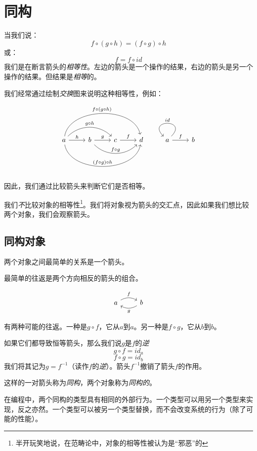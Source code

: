 \documentclass[DaoFP]{subfiles}
\begin{document}
\setcounter{chapter}{2}


\chapter{同构}

当我们说：
\[f \circ (g \circ h) = (f \circ g) \circ h \]
或：
\[ f = f \circ id \]
我们是在断言箭头的\emph{相等性}。左边的箭头是一个操作的结果，右边的箭头是另一个操作的结果。但结果是\emph{相等}的。

我们经常通过绘制\emph{交换}图来说明这种相等性，例如：

\[
 \begin{tikzcd}
 a
 \arrow[r, "h"]
 \arrow[rr, bend left=45, "g \circ h"]
 \arrow[rrr, bend left=80, "f \circ (g \circ h)"]
 \arrow[rrr, bend right=80, "(f \circ g) \circ h"]
 & b
 \arrow[r, "g"]
 \arrow[rr, bend right=45, "f \circ g"]
 &c
 \arrow[r, "f"]
 &d
 \end{tikzcd}
 \begin{tikzcd}
 a
 \arrow[r, "f"]
 \arrow[r, loop, "id"']
 &b
 \end{tikzcd}
\]

因此，我们通过比较箭头来判断它们是否相等。

我们\emph{不}比较对象的相等性\footnote{半开玩笑地说，在范畴论中，对象的相等性被认为是“邪恶”的}。我们将对象视为箭头的交汇点，因此如果我们想比较两个对象，我们会观察箭头。

\section{同构对象}

两个对象之间最简单的关系是一个箭头。

最简单的往返是两个方向相反的箭头的组合。

\[
 \begin{tikzcd}
 a
 \arrow[r, bend left, "f"]
 & b
 \arrow[l, bend left, "g"]
 \end{tikzcd}
\]

有两种可能的往返。一种是$g \circ f$，它从$a$到$a$。另一种是$f \circ g$，它从$b$到$b$。

如果它们都导致恒等箭头，那么我们说$g$是$f$的\emph{逆}
\[ g \circ f = id_a\]
\[f \circ g = id_b\]
我们将其记为$g = f^{-1}$（读作$f$的\emph{逆}）。箭头$ f^{-1}$撤销了箭头$f$的作用。

这样的一对箭头称为\emph{同构}，两个对象称为\emph{同构的}。

在编程中，两个同构的类型具有相同的外部行为。一个类型可以用另一个类型来实现，反之亦然。一个类型可以被另一个类型替换，而不会改变系统的行为（除了可能的性能）。
\end{document}
